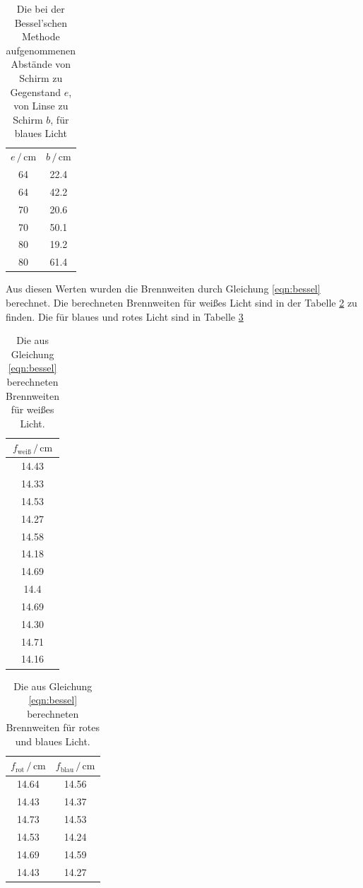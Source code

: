 \begin{table}
    \centering
    \begin{tabular}{cc}
    \toprule
    $e\,/\,\si{\centi\meter}$ & $b\,/\, \si{\centi\meter}$\\
    64 &  22.4 \\
    64 &  42.2 \\
    70 &  20.6 \\
    70 &  50.1 \\
    80 &  19.2 \\
    80 &  61.4 \\
    \bottomrule
    \end{tabular}
    \caption{Die bei der Bessel'schen Methode aufgenommenen Abstände von Schirm zu Gegenstand $e$, von Linse zu Schirm $b$, für blaues Licht}
    \label{tab:blau}
\end{table}

Aus diesen Werten wurden die Brennweiten durch Gleichung \eqref{eqn:bessel} berechnet.
Die berechneten Brennweiten für weißes Licht sind in der Tabelle \ref{tab:brennweiten_weis} zu finden.
Die für blaues und rotes Licht sind in Tabelle \ref{tab:blau_rot}
\begin{table}
    \centering
    \begin{tabular}{c}
    \toprule
    $f_\text{weiß} \,/\, \si{\centi\meter}$ \\
    \midrule
    14.43\\
    14.33\\
    14.53\\
    14.27\\
    14.58\\
    14.18\\
    14.69\\
    14.4\\
    14.69\\
    14.30\\
    14.71\\
    14.16\\
    \bottomrule
    \end{tabular}
    \caption{Die aus Gleichung \eqref{eqn:bessel} berechneten Brennweiten für weißes Licht.}
    \label{tab:brennweiten_weis}
\end{table}

\begin{table}
    \centering
    \begin{tabular}{cc}
    \toprule
    $f_\text{rot} \,/\, \si{\centi\meter}$ & $f_\text{blau} \,/\, \si{\centi\meter}$ \\
    \midrule
    14.64 & 14.56 \\
    14.43 & 14.37\\
    14.73 & 14.53\\
    14.53 & 14.24\\
    14.69 & 14.59\\
    14.43 & 14.27\\
    \bottomrule
    \end{tabular}
    \caption{Die aus Gleichung \eqref{eqn:bessel} berechneten Brennweiten für rotes und blaues Licht.}
    \label{tab:blau_rot}
\end{table}

